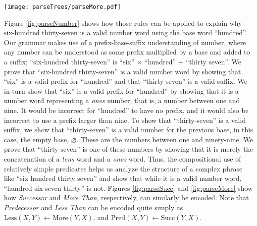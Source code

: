 \documentclass[10pt,letterpaper]{article}
\begin{document}
\begin{figure*}[t]
		\texttt{[image: parseTrees/parseMore.pdf]}
		\caption{A parse for the fact that ``one-hundred one'' is more than ``fifty-two''.}
		\label{fig:parseMore}
\end{figure*}

Figure \ref{fig:parseNumber} shows how those rules can be applied to
explain why six-hundred thirty-seven is a valid number word using the
base word ``hundred''. Our grammar makes use of a prefix-base-suffix
understanding of number, where any number can be understood as some
prefix multiplied by a base and added to a suffix; ``six-hundred
thirty-seven'' is ``six'' $\times$ ``hundred'' $+$ ``thirty
seven''. We prove that ``six-hundred thirty-seven'' is a valid number
word by showing that ``six'' is a valid prefix for ``hundred'' and
that ``thirty-seven'' is a valid suffix. We in turn show that ``six''
is a valid prefix for ``hundred'' by showing that it is a number word
representing a \emph{ones} number, that is, a number between one and
nine. It would be incorrect for ``hundred'' to have no prefix, and it
would also be incorrect to use a prefix larger than nine. To show that
``thirty-seven'' is a valid suffix, we show that ``thirty-seven'' is a
valid number for the previous base, in this case, the empty base,
$\varnothing$. These are the numbers between one and ninety-nine. We
prove that ``thirty-seven'' is one of these numbers by showing that it
is merely the concatenation of a \emph{tens} word and a \emph{ones}
word. Thus, the compositional use of relatively simple predicates
helps us analyze the structure of a complex phrase like ``six hundred
thirty seven'' and show that while it is a valid number word,
``hundred six seven thirty'' is not. Figures \ref{fig:parseSucc} and
\ref{fig:parseMore} show how \emph{Successor} and \emph{More Than},
respectively, can similarly be encoded. Note that \emph{Predecessor}
and \emph{Less Than} can be encoded quite simply as $\text{Less}(X,Y)
\leftarrow \text{More}(Y,X).$ and $\text{Pred}(X,Y) \leftarrow
\text{Succ}(Y,X).$
\end{document}
